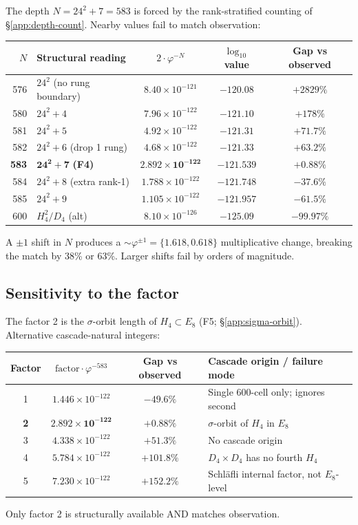 \documentclass[11pt]{article}
\theoremstyle{plain}
\theoremstyle{definition}
\theoremstyle{remark}
\begin{document}
The depth $N = 24^2 + 7 = 583$ is forced by the rank-stratified counting of \S\ref{app:depth-count}. Nearby values fail to match observation:
\begin{center}
\begin{tabular}{rlccc}
\toprule
$N$ & Structural reading & $2 \cdot \varphi^{-N}$ & $\log_{10}$ value & Gap vs observed \\
\midrule
576 & $24^2$ (no rung boundary) & $8.40 \times 10^{-121}$ & $-120.08$ & $+2829\%$ \\
580 & $24^2 + 4$ & $7.96 \times 10^{-122}$ & $-121.10$ & $+178\%$ \\
581 & $24^2 + 5$ & $4.92 \times 10^{-122}$ & $-121.31$ & $+71.7\%$ \\
582 & $24^2 + 6$ (drop 1 rung) & $4.68 \times 10^{-122}$ & $-121.33$ & $+63.2\%$ \\
\textbf{583} & $\mathbf{24^2 + 7}$ \textbf{(F4)} & $\mathbf{2.892 \times 10^{-122}}$ & $\mathbf{-121.539}$ & $\mathbf{+0.88\%}$ \\
584 & $24^2 + 8$ (extra rank-1) & $1.788 \times 10^{-122}$ & $-121.748$ & $-37.6\%$ \\
585 & $24^2 + 9$ & $1.105 \times 10^{-122}$ & $-121.957$ & $-61.5\%$ \\
600 & $H_4^2/D_4$ (alt) & $8.10 \times 10^{-126}$ & $-125.09$ & $-99.97\%$ \\
\bottomrule
\end{tabular}
\end{center}
A $\pm 1$ shift in $N$ produces a $\sim \varphi^{\pm 1} = \{1.618, 0.618\}$ multiplicative change, breaking the match by 38\% or 63\%. Larger shifts fail by orders of magnitude.

\subsection{Sensitivity to the factor}\label{app:sensitivity-factor}

The factor 2 is the $\sigma$-orbit length of $H_4 \subset E_8$ (F5; \S\ref{app:sigma-orbit}). Alternative cascade-natural integers:
\begin{center}
\begin{tabular}{cccl}
\toprule
Factor & $\text{factor} \cdot \varphi^{-583}$ & Gap vs observed & Cascade origin / failure mode \\
\midrule
1 & $1.446 \times 10^{-122}$ & $-49.6\%$ & Single 600-cell only; ignores second \\
\textbf{2} & $\mathbf{2.892 \times 10^{-122}}$ & $\mathbf{+0.88\%}$ & $\sigma$-orbit of $H_4$ in $E_8$ \\
3 & $4.338 \times 10^{-122}$ & $+51.3\%$ & No cascade origin \\
4 & $5.784 \times 10^{-122}$ & $+101.8\%$ & $D_4 \times D_4$ has no fourth $H_4$ \\
5 & $7.230 \times 10^{-122}$ & $+152.2\%$ & Schl\"afli internal factor, not $E_8$-level \\
\bottomrule
\end{tabular}
\end{center}
Only factor 2 is structurally available AND matches observation.
\end{document}
